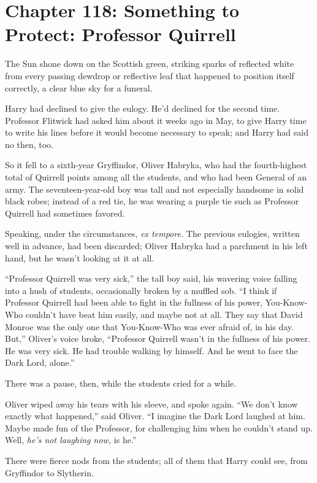 \chapter{Chapter 118: Something to Protect: Professor Quirrell}
The Sun shone down on the Scottish green, striking sparks of reflected white from every passing dewdrop or reflective leaf that happened to position itself correctly, a clear blue sky for a funeral.

Harry had declined to give the eulogy. He'd declined for the second time. Professor Flitwick had asked him about it weeks ago in May, to give Harry time to write his lines before it would become necessary to speak; and Harry had said no then, too.

So it fell to a sixth-year Gryffindor, Oliver Habryka, who had the fourth-highest total of Quirrell points among all the students, and who had been General of an army. The seventeen-year-old boy was tall and not especially handsome in solid black robes; instead of a red tie, he was wearing a purple tie such as Professor Quirrell had sometimes favored.

Speaking, under the circumstances, \emph{ex tempore.} The previous eulogies, written well in advance, had been discarded; Oliver Habryka had a parchment in his left hand, but he wasn't looking at it at all.

``Professor Quirrell was very sick,'' the tall boy said, his wavering voice falling into a hush of students, occasionally broken by a muffled sob. ``I think if Professor Quirrell had been able to fight in the fullness of his power, You-Know-Who couldn't have beat him easily, and maybe not at all. They say that David Monroe was the only one that You-Know-Who was ever afraid of, in his day. But,'' Oliver's voice broke, ``Professor Quirrell wasn't in the fullness of his power. He was very sick. He had trouble walking by himself. And he went to face the Dark Lord, alone.''

There was a pause, then, while the students cried for a while.

Oliver wiped away his tears with his sleeve, and spoke again. ``We don't know exactly what happened,'' said Oliver. ``I imagine the Dark Lord laughed at him. Maybe made fun of the Professor, for challenging him when he couldn't stand up. Well, \emph{he's not laughing now,} is he.''

There were fierce nods from the students; all of them that Harry could see, from Gryffindor to Slytherin.


